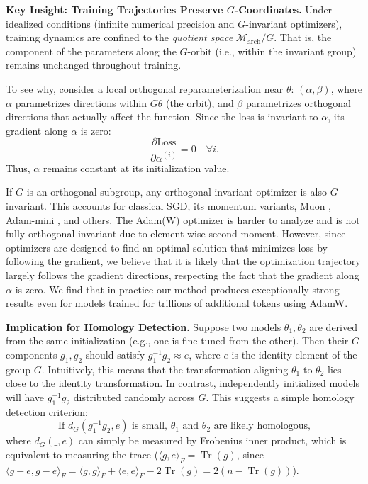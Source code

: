 \documentclass{article} %
\DeclareMathOperator{\Tr}{Tr}
\begin{document}
\textbf{Key Insight: Training Trajectories Preserve $G$-Coordinates. }
Under idealized conditions (infinite numerical precision and $G$-invariant optimizers), training dynamics are confined to the \textit{quotient space} $\mathcal{M}_{\text{arch}} / G$. That is, the component of the parameters along the $G$-orbit (i.e., within the invariant group) remains unchanged throughout training.

To see why, consider a local orthogonal reparameterization near $\theta$: $(\alpha, \beta)$, where $\alpha$ parametrizes directions within $G\theta$ (the orbit), and $\beta$ parametrizes orthogonal directions that actually affect the function. Since the loss is invariant to $\alpha$, its gradient along $\alpha$ is zero:
\[
\frac{\partial \text{Loss}}{\partial \alpha^{(i)}} = 0 \quad \forall i.
\]
Thus, $\alpha$ remains constant at its initialization value.

If $G$ is an orthogonal subgroup, any orthogonal invariant optimizer is also $G$-invariant. 
This accounts for classical SGD, its momentum variants, Muon \citep{jordan2024muon}, Adam-mini \citep{zhang2025adamminiusefewerlearning}, and others. The Adam(W) optimizer is harder to analyze and is not fully orthogonal invariant due to element-wise second moment. However, since optimizers are designed to find an optimal solution that minimizes loss by following the gradient, we believe that it is likely that the optimization trajectory largely follows the gradient directions, respecting the fact that the gradient along $\alpha$ is zero. 
We find that in practice our method produces exceptionally strong results even for models trained for trillions of additional tokens using AdamW.


\textbf{Implication for Homology Detection.}
Suppose two models $\theta_1, \theta_2$ are derived from the same initialization (e.g., one is fine-tuned from the other). Then their $G$-components $g_1, g_2$ should satisfy $g_1^{-1} g_2 \approx e$, where $e$ is the identity element of the group $G$. 
Intuitively, this means that the transformation aligning $\theta_1$ to $\theta_2$ lies close to the identity transformation.
In contrast, independently initialized models will have $g_1^{-1} g_2$ distributed randomly across $G$. This suggests a simple homology detection criterion:
\[
\text{If } d_G(g_1^{-1} g_2, e) \text{ is small, } \theta_1 \text{ and } \theta_2 \text{ are likely homologous,}
\]
where $d_G(\_, e)$ can simply be measured by Frobenius inner product, which is equivalent to measuring the trace ($\langle g, e\rangle_F = \Tr(g)$, since $\langle g-e, g-e\rangle_F = \langle g, g\rangle_F + \langle e, e\rangle_F -2\Tr(g) = 2(n-\Tr(g))$). 
\end{document}
